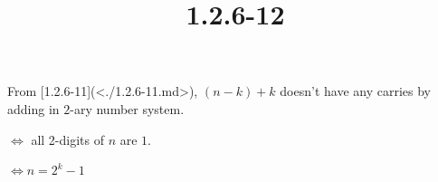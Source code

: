 \documentclass{article}
\title{1.2.6-12}
\begin{document}
\maketitle

From [1.2.6-11](<./1.2.6-11.md>), \( (n-k) + k \) doesn't have any carries by adding in \( 2 \)-ary number system.

\( \iff \) all 2-digits of \( n \) are \( 1 \).

\( \iff n = 2^k - 1 \)
\end{document}
